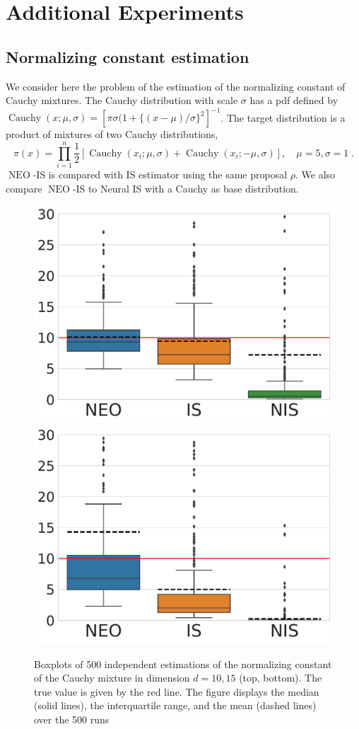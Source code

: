 \documentclass{article}
\def\IFIS{\ensuremath{\operatorname{NEO}}}
\def\NEO{{\small \IFIS}}
\def\eqsp{\,}
\def\eqsp{\;}
\newcommand{\1}{\mathds{1}}
\def\target{\pi}
\def\proposal{\rho}
\begin{document}
\section{Additional Experiments}
\subsection{Normalizing constant estimation}
\label{sup:sec:additional_xp}
We consider here the problem of the estimation of the normalizing constant of Cauchy mixtures. The Cauchy distribution with scale $\sigma$ has a pdf defined by $\operatorname{Cauchy}(x; \mu, \sigma) = [\pi\sigma(1+ \{(x-\mu)/\sigma\}^2]^{-1}$. The target distribution is a product of mixtures of two Cauchy distributions, \begin{equation*}
\label{eq:cauchymixture}
\target(x)= \prod_{i=1}^{n} \frac{1}{2}\left[\operatorname{Cauchy}\left(x_{i} ; \mu, \sigma\right)+\operatorname{Cauchy}\left(x_{i} ; -\mu, \sigma\right)\right]
,\quad \mu = 5, \sigma = 1\eqsp.
\end{equation*}
\IFIS-IS is compared with IS estimator using the same proposal $\proposal$. We also compare \NEO-IS to Neural IS \cite{muller2018neural} with a Cauchy as base distribution.
\begin{figure}[!ht]
    \centering
    \includegraphics[width=0.4 \linewidth]{cauchy10.pdf}
    \includegraphics[width=0.4 \linewidth]{cauchy15.pdf}
    \caption{Boxplots of 500 independent estimations of the normalizing constant of the Cauchy mixture in dimension $d={10,15}$ (top, bottom). The true value is given by the red line. The figure displays the median (solid lines), the interquartile range, and the mean (dashed lines) over the 500 runs}
    \label{fig:simple_gauss}
\end{figure}
\end{document}
